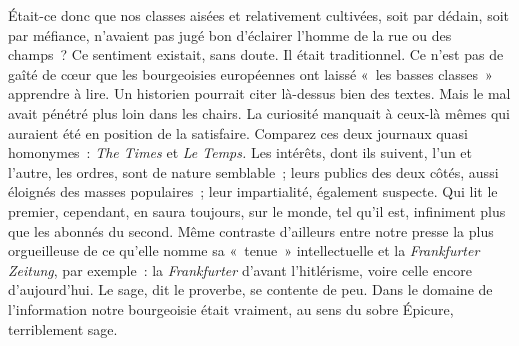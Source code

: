 \documentclass[french,twoside]{book} %
\begin{document}
Était-ce donc que nos classes aisées et relativement cultivées, soit par dédain, soit par méfiance, n’avaient pas jugé bon d’éclairer l’homme de la rue ou des champs ? Ce sentiment existait, sans doute. Il était traditionnel. Ce n’est pas de gaîté de cœur que les bourgeoisies européennes ont laissé « les basses classes » apprendre à lire. Un historien pourrait citer là-dessus bien des textes. Mais le mal avait pénétré plus loin dans les chairs. La curiosité manquait à ceux-là mêmes qui auraient été en position de la satisfaire. Comparez ces deux journaux quasi homonymes : \emph{The Times} et \emph{Le Temps.} Les intérêts, dont ils suivent, l’un et l’autre, les ordres, sont de nature semblable ; leurs publics des deux côtés, aussi éloignés des masses populaires ; leur impartialité, également suspecte. Qui lit le premier, cependant, en saura toujours, sur le monde, tel qu’il est, infiniment plus que les abonnés du second. Même contraste d’ailleurs entre notre presse la plus orgueilleuse de ce qu’elle nomme sa « tenue » intellectuelle et la \emph{Frankfurter Zeitung}, par exemple : la   \emph{Frankfurter} d’avant l’hitlérisme, voire celle encore d’aujourd’hui. Le sage, dit le proverbe, se contente de peu. Dans le domaine de l’information notre bourgeoisie était vraiment, au sens du sobre Épicure, terriblement sage.\par
\end{document}
